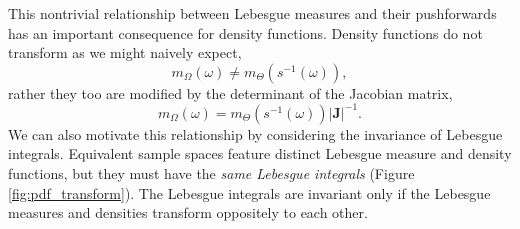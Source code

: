 This nontrivial relationship between Lebesgue measures and their
pushforwards has an important consequence for density functions.  
Density functions do not transform as we might naively expect,
%
\begin{equation*}
m_{\Omega} \! \left( \omega \right) 
\ne 
m_{\Theta} \! \left( s^{-1} \! \left( \omega \right) \right),
\end{equation*}
%
rather they too are modified by the determinant of the Jacobian matrix,
%
\begin{equation*}
m_{\Omega} \! \left( \omega \right) 
= 
m_{\Theta} \! \left( s^{-1} \! \left( \omega \right) \right) | \mathbf{J} |^{-1}.
\end{equation*}
%
We can also motivate this relationship by considering the invariance
of Lebesgue integrals.  Equivalent sample spaces feature distinct
Lebesgue measure and density functions, but they must have the
\emph{same Lebesgue integrals} (Figure \ref{fig:pdf_transform}).
The Lebesgue integrals are invariant only if the Lebesgue measures
and densities transform oppositely to each other.

